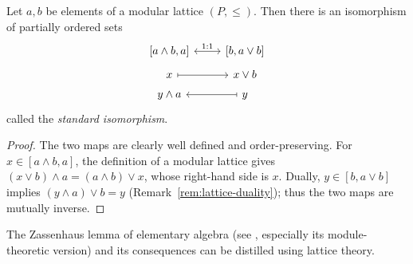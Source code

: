 \begin{proposition}\label{prop:lattice-diamond-isom}
	Let $a,b$ be elements of a modular lattice $(P,\leq)$. Then there is an
	isomorphism of partially ordered sets
	\[\begin{tikzcd}[row sep=tiny]
		{[a \wedge b, a]} \arrow[leftrightarrow, r, "1:1"] & {[b, a \vee b]} \\
		x \arrow[mapsto, r] & x \vee b \\
		y \wedge a & y \arrow[mapsto, l]
	\end{tikzcd}\]
	called the \emph{standard isomorphism}.
\end{proposition}
\begin{proof}
	The two maps are clearly well defined and order-preserving. For
	$x\in[a\wedge b,a]$, the definition of a modular lattice gives
	$(x\vee b)\wedge a=(a\wedge b)\vee x$, whose right-hand side is $x$.
	Dually, $y\in[b,a\vee b]$ implies $(y\wedge a)\vee b=y$
	(Remark~\ref{rem:lattice-duality}); thus the two maps are mutually inverse.
\end{proof}

The Zassenhaus lemma of elementary algebra (see \cite[Lemma 4.6.4]{Li1},
especially its module-theoretic version) and its consequences can be distilled
using lattice theory.

